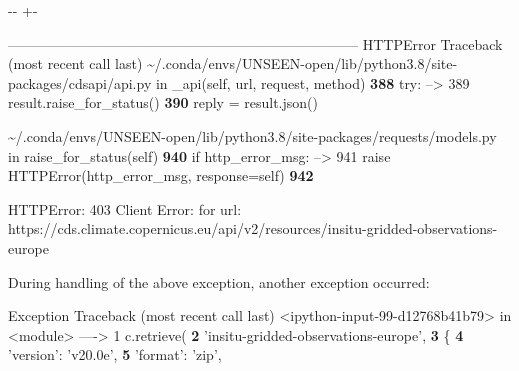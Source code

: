 \documentclass[letterpaper,10pt,english]{sphinxmanual}
\newlength\nbsphinxcodecellspacing
\begin{document}
{

\kern-\sphinxverbatimsmallskipamount\kern-\baselineskip
\kern+\FrameHeightAdjust\kern-\fboxrule
\vspace{\nbsphinxcodecellspacing}

\begin{sphinxVerbatim}[commandchars=\\\{\}]
\textcolor{ansi-red}{---------------------------------------------------------------------------}
\textcolor{ansi-red}{HTTPError}                                 Traceback (most recent call last)
\textcolor{ansi-green}{\textasciitilde{}/.conda/envs/UNSEEN-open/lib/python3.8/site-packages/cdsapi/api.py} in \textcolor{ansi-cyan}{\_api}\textcolor{ansi-blue}{(self, url, request, method)}
\textcolor{ansi-green-intense}{\textbf{    388}}         \textcolor{ansi-green}{try}\textcolor{ansi-blue}{:}
\textcolor{ansi-green}{--> 389}\textcolor{ansi-red}{             }result\textcolor{ansi-blue}{.}raise\_for\_status\textcolor{ansi-blue}{(}\textcolor{ansi-blue}{)}
\textcolor{ansi-green-intense}{\textbf{    390}}             reply \textcolor{ansi-blue}{=} result\textcolor{ansi-blue}{.}json\textcolor{ansi-blue}{(}\textcolor{ansi-blue}{)}

\textcolor{ansi-green}{\textasciitilde{}/.conda/envs/UNSEEN-open/lib/python3.8/site-packages/requests/models.py} in \textcolor{ansi-cyan}{raise\_for\_status}\textcolor{ansi-blue}{(self)}
\textcolor{ansi-green-intense}{\textbf{    940}}         \textcolor{ansi-green}{if} http\_error\_msg\textcolor{ansi-blue}{:}
\textcolor{ansi-green}{--> 941}\textcolor{ansi-red}{             }\textcolor{ansi-green}{raise} HTTPError\textcolor{ansi-blue}{(}http\_error\_msg\textcolor{ansi-blue}{,} response\textcolor{ansi-blue}{=}self\textcolor{ansi-blue}{)}
\textcolor{ansi-green-intense}{\textbf{    942}}

\textcolor{ansi-red}{HTTPError}: 403 Client Error:  for url: https://cds.climate.copernicus.eu/api/v2/resources/insitu-gridded-observations-europe

During handling of the above exception, another exception occurred:

\textcolor{ansi-red}{Exception}                                 Traceback (most recent call last)
\textcolor{ansi-green}{<ipython-input-99-d12768b41b79>} in \textcolor{ansi-cyan}{<module>}
\textcolor{ansi-green}{----> 1}\textcolor{ansi-red}{ c.retrieve(
}\textcolor{ansi-green-intense}{\textbf{      2}}     \textcolor{ansi-blue}{'insitu-gridded-observations-europe'}\textcolor{ansi-blue}{,}
\textcolor{ansi-green-intense}{\textbf{      3}}     \{
\textcolor{ansi-green-intense}{\textbf{      4}}         \textcolor{ansi-blue}{'version'}\textcolor{ansi-blue}{:} \textcolor{ansi-blue}{'v20.0e'}\textcolor{ansi-blue}{,}
\textcolor{ansi-green-intense}{\textbf{      5}}         \textcolor{ansi-blue}{'format'}\textcolor{ansi-blue}{:} \textcolor{ansi-blue}{'zip'}\textcolor{ansi-blue}{,}


\end{sphinxVerbatim}}
\end{document}
